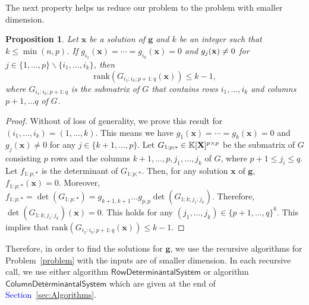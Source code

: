\documentclass[11pt]{article}
\numberwithin{Property}{section}
\numberwithin{Theorem}{section}
\newtheorem{Proposition}{Proposition}%
\numberwithin{Proposition}{section}
\numberwithin{Lemma}{section}
\numberwithin{Corollary}{section}
\numberwithin{Definition}{section}
\numberwithin{Remark}{section}
\numberwithin{Conjecture}{section}
\numberwithin{Problem}{section}
\numberwithin{Claim}{section}
\theoremstyle{definition}
\numberwithin{Example}{section}
\def\g {\ensuremath{\mathbf{g}}}
\renewcommand{\leq}{\leqslant}
\newcommand{\field}{\mathbb{K}} %
\newcommand{\mat}[1]{\mathbf{\MakeUppercase{#1}}} %
\newcommand{\improve}[1]{\textcolor{blue}{#1}} %
\begin{document}
The next property helps us reduce our problem to the problem with smaller dimension. 
\begin{Proposition} \label{r2}
Let $\mathbf{x}$ be a solution of $\g$ and $k$ be an integer such that $k \leq \min(n,p)$. If $g_{i_1}(\mathbf{x}) = \cdots = g_{i_k}(\mathbf{x}) = 0$ and $g_{j}({\bf x}) \ne 0$ for $j \in \{1, \ldots, p\} \backslash \{i_1, \ldots, i_k\}$, then 
\[\mathrm{rank}(G_{i_1:i_k\mathbf{;}p+1:q}({\mathbf{x}})) \leq k-1, \]
where $G_{i_1:i_k\mathbf{;}p+1:q}$ is the submatrix of $G$ that contains rows $i_1, \ldots, i_k$ and columns $p+1, \ldots q$ of $G$. 
\end{Proposition}
\begin{proof} Without of loss of generality, we prove this result for $(i_1, \ldots, i_k) = (1, \ldots, k)$. This means we have $g_{1}(\mathbf{x}) = \cdots = g_{k}(\mathbf{x}) = 0$ and $g_{j}(\mathbf{x}) \ne 0$ for any $j \in \{k+1, \ldots, p\}$. Let $G_{1:p;*} \in \field[\mat{X}]^{p \times p}$ be the submatrix of $G$ consisting $p$ rows and the columns $k+1, \ldots, p, j_1, \ldots, j_k$ of $G$, where $p+1 \leq j_i \leq q$. Let $f_{1:p;*}$ is the determinant of $G_{1:p;*}$. Then, for any solution $\mathbf{x}$ of $\g$, $f_{1:p;*}(\mathbf{x}) = 0$. Moreover, $f_{1:p;*} = \det(G_{1:p;*}) = g_{k+1,k+1} \ldots g_{p,p} \det(G_{1:k;j_1:j_k})$. Therefore, $\det(G_{1:k;j_1:j_k})(\mathbf{x}) = 0$. This holds for any $(j_1, \ldots, j_k) \in \{p+1, \ldots, q\}^{k}$. This implies that $\mathrm{rank}(G_{i_1:i_k\mathbf{;}p+1:q}({\mathbf{x}})) \leq k-1$. 

\end{proof}

Therefore, in order to find the solutions for $\g$, we use the recursive algorithms for Problem~\ref{problem} with the inputs are of smaller dimension. In each recursive call, we use either algorithm $\mathsf{Row Determinantal System}$ or algorithm $\mathsf{ColumnDeterminantal System}$ which are given at the end of \improve{Section~\ref{sec:Algorithms}}. 
\end{document}
